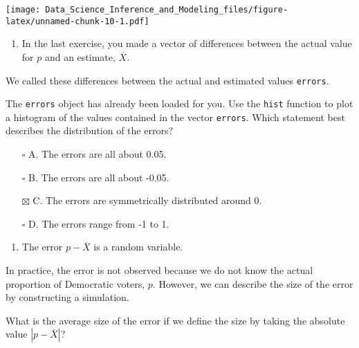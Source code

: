 \documentclass[
]{article}
\providecommand{\tightlist}{%
  \setlength{\itemsep}{0pt}\setlength{\parskip}{0pt}}
\begin{document}
\texttt{[image: Data\_Science\_Inference\_and\_Modeling\_files/figure-latex/unnamed-chunk-10-1.pdf]}

\begin{enumerate}
\def\labelenumi{\arabic{enumi}.}
\setcounter{enumi}{2}
\tightlist
\item
  In the last exercise, you made a vector of differences between the
  actual value for \(p\) and an estimate, \(\overline{X}\).
\end{enumerate}

We called these differences between the actual and estimated values
\texttt{errors}.

The \texttt{errors} object has already been loaded for you. Use the
\texttt{hist} function to plot a histogram of the values contained in
the vector \texttt{errors}. Which statement best describes the
distribution of the errors?

\begin{itemize}
\tightlist
\item[$\square$]
  A. The errors are all about 0.05.
\item[$\square$]
  B. The errors are all about -0.05.
\item[$\boxtimes$]
  C. The errors are symmetrically distributed around 0.
\item[$\square$]
  D. The errors range from -1 to 1.
\end{itemize}

\begin{enumerate}
\def\labelenumi{\arabic{enumi}.}
\setcounter{enumi}{3}
\tightlist
\item
  The error \(p - \overline{X}\) is a random variable.
\end{enumerate}

In practice, the error is not observed because we do not know the actual
proportion of Democratic voters, \(p\). However, we can describe the
size of the error by constructing a simulation.

What is the average size of the error if we define the size by taking
the absolute value \(|p - \overline{X}|\)?
\end{document}

